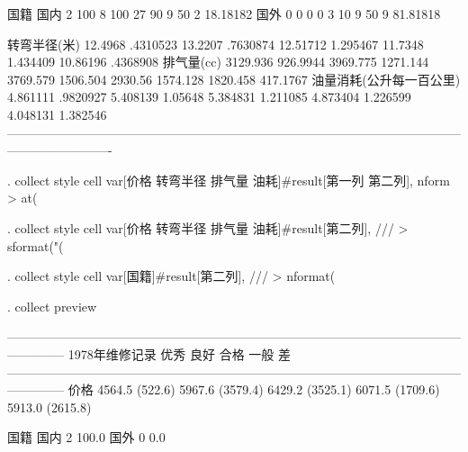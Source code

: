 \documentclass{ctexart}
\begin{document}
国籍                                                                                                                                 
  国内                           2        100          8        100         27         90          9         50          2   18.18182
  国外                           0          0          0          0          3         10          9         50          9   81.81818
                                                                                                                                     
转弯半径(米)               12.4968   .4310523    13.2207   .7630874   12.51712   1.295467    11.7348   1.434409   10.86196   .4368908
排气量(cc)                3129.936   926.9944   3969.775   1271.144   3769.579   1506.504    2930.56   1574.128   1820.458   417.1767
油量消耗(公升每一百公里)  4.861111   .9820927   5.408139    1.05648   5.384831   1.211085   4.873404   1.226599   4.048131   1.382546
-------------------------------------------------------------------------------------------------------------------------------------

. collect style cell var[价格 转弯半径 排气量 油耗]#result[第一列 第二列], nform
> at(%

. collect style cell var[价格 转弯半径 排气量 油耗]#result[第二列], ///
>         sformat("(%

. collect style cell var[国籍]#result[第二列], ///
>         nformat(%

. collect preview

--------------------------------------------------------------------------------------------------------------------------
                                                                   1978年维修记录                                         
                                优秀                良好                合格                一般                 差       
--------------------------------------------------------------------------------------------------------------------------
价格                      4564.5   (522.6)   5967.6   (3579.4)   6429.2   (3525.1)   6071.5   (1709.6)   5913.0   (2615.8)
                                                                                                                          
国籍                                                                                                                      
  国内                         2    100.0%
  国外                         0      0.0%
                                                                                                                          
\end{document}
